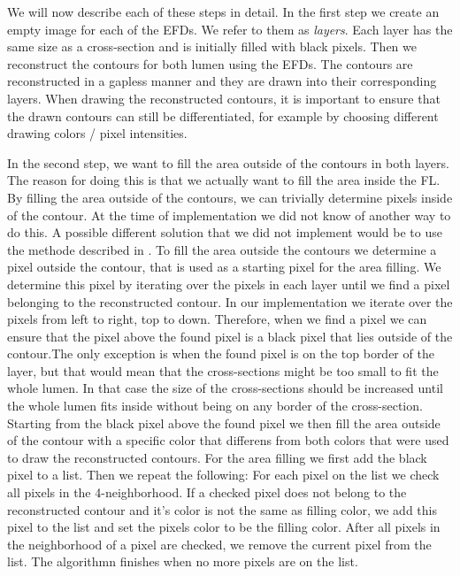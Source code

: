 \documentclass[thesis.tex]{subfiles}
\begin{document}
We will now describe each of these steps in detail. In the first step we create an empty image for each of the EFDs. We refer to them as \textit{layers}. Each layer has the same size as a cross-section and is initially filled with black pixels. Then we reconstruct the contours for both lumen using the EFDs. The contours are reconstructed in a gapless manner and they are drawn into their corresponding layers. When drawing the reconstructed contours, it is important to ensure that the drawn contours can still be differentiated, for example by choosing different drawing colors / pixel intensities. 

In the second step, we want to fill the area outside of the contours in both layers. The reason for doing this is that we actually want to fill the area inside the FL. By filling the area outside of the contours,  we can trivially determine pixels inside of the contour. At the time of implementation we did not know of another way to do this. A possible different solution that we did not implement would be to use the methode described in \cite{inside_contour}.  To fill the area outside the  contours we determine a pixel outside the contour, that is used as a starting pixel for the area filling. We determine this pixel by iterating over the pixels in each layer until we find a pixel belonging to the reconstructed contour. In our implementation we iterate over the pixels from left to right, top to down. Therefore, when we find a pixel we can ensure that the pixel above the found pixel is a black pixel that lies outside of the contour.The only exception is when the found pixel is on the top border of the layer, but that would mean that the cross-sections might be too small to fit the whole lumen. In that case the size of the cross-sections should be increased until the whole lumen fits inside without being on any border of the cross-section. \\  Starting from the black pixel above the found pixel we then fill the area outside of the contour with a specific color that differens from both colors that were used to draw the reconstructed contours. For the area filling we first add the black pixel to a list. Then we repeat the following: For each pixel on the list we check all pixels in the 4-neighborhood. If a checked pixel does not belong to the reconstructed contour and it's color is not the same as filling color, we add this pixel to the list and set the pixels color to be the filling color. After all pixels in the neighborhood of a pixel are checked, we remove the current pixel from the list. The algorithmn finishes when no more pixels are on the list. \\
\end{document}
